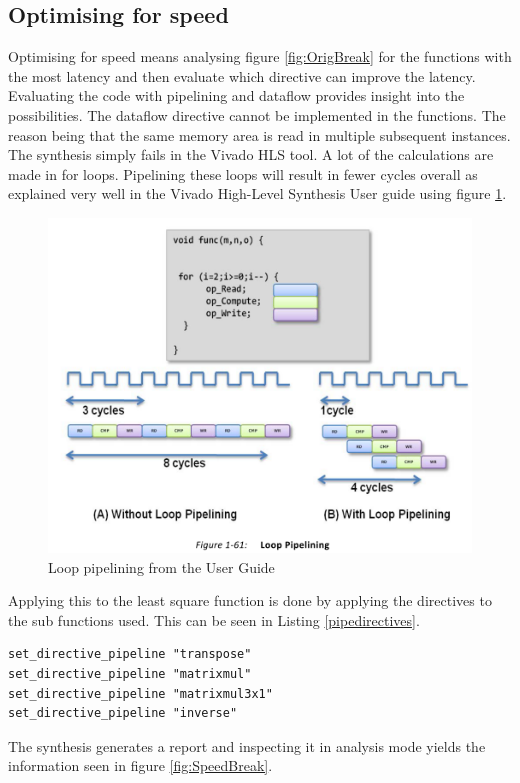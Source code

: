 \subsection{Optimising for speed}
Optimising for speed means analysing figure \ref{fig:OrigBreak} for the functions with the most latency and then evaluate which directive can improve the latency. Evaluating the code with pipelining and dataflow provides insight into the possibilities. The dataflow directive cannot be implemented in the functions. The reason being that the same memory area is read in multiple subsequent instances. The synthesis simply fails in the Vivado HLS tool.
A lot of the calculations are made in for loops. Pipelining these loops will result in fewer cycles overall as explained very well in the Vivado High-Level Synthesis User guide using figure \ref{fig:looppipelining}.
\begin{figure}[H]
\centering
\includegraphics[scale=1]{billeder/looppipelining}
\caption{Loop pipelining from the User Guide}
\label{fig:looppipelining}
\end{figure}
Applying this to the least square function is done by applying the directives to the sub functions used. This can be seen in Listing \ref{pipedirectives}.
\begin{lstlisting}[caption={pipelining directives applied to the least squares sub functions},label=pipedirectives]
set_directive_pipeline "transpose"
set_directive_pipeline "matrixmul"
set_directive_pipeline "matrixmul3x1"
set_directive_pipeline "inverse"
\end{lstlisting}
The synthesis generates a report and inspecting it in analysis mode yields the information seen in figure \ref{fig:SpeedBreak}.
